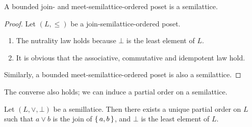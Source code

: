 \begin{proposition}
A bounded join- and meet-semilattice-ordered poset is a semilattice.
\end{proposition}
\begin{proof}
Let $(L,\leq)$ be a join-semilattice-ordered poset.
\begin{enumerate}
\item The nutrality law holds because $\bot$ is the least element of $L$. 
\item It is obvious that the associative, commutative and idempotent law hold.
\end{enumerate}
Similarly, a bounded meet-semilattice-ordered poset is also a semilattice.
\end{proof}
%
The converse also holds; we can induce a partial order on a semilattice.
%
\begin{theorem} 
\label{basicTheorem}
Let $(L,\vee,\bot)$   be a semillatice. 
Then there exists a unique partial order on $L$ 
such that $a \vee b$ is the join of $\set{a,b}$, and
$\bot$ is the least element of $L$. 
\end{theorem}
%
